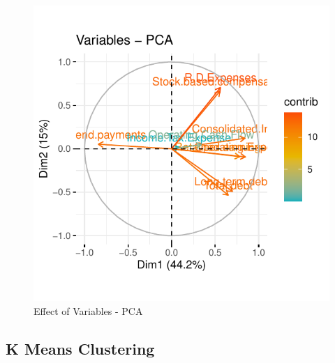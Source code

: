 \documentclass[11pt,]{article}
\begin{document}
\begin{figure}

{\centering \includegraphics{stock_analysis_files/figure-latex/PCAvar-1} 

}

\caption{Effect of Variables - PCA}\label{fig:PCAvar}
\end{figure}

\hypertarget{k-means-clustering}{%
\subsection{K Means Clustering}\label{k-means-clustering}}
\end{document}
